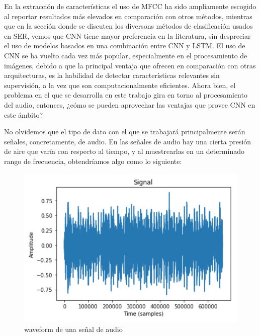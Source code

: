 \documentclass[11pt,a4paper,spanish]{book}
\begin{document}
	En la extracción de características el uso de MFCC ha sido ampliamente escogido al reportar resultados más elevados en comparación con otros métodos, mientras que en la sección donde se discuten los diversons métodos de clasificación usados en SER, vemos que CNN tiene mayor preferencia en la literatura, sin despreciar el uso de modelos basados en una combinación entre CNN y LSTM.\hfill \break
	El uso de CNN se ha vuelto cada vez más popular, especialmente en el procesamiento de imágenes, debido a que la principal ventaja que ofrecen en comparación con otras arquitecturas, es la habilidad de detectar características relevantes sin supervisión, a la vez que son computacionalmente eficientes.
	Ahora bien, el problema en el que se desarrolla en este trabajo gira en torno al procesamiento del audio, entonces, ¿cómo se pueden aprovechar las ventajas que provee CNN en este ámbito?
	
	No olvidemos que el tipo de dato con el que se trabajará principalmente serán señales, concretamente, de audio. En las señales de audio hay una cierta presión de aire que varía con respecto al tiempo, y al muestrearlas en un determinado rango de frecuencia, obtendríamos algo como lo siguiente:
	
	\begin{figure}[H]
		\includegraphics[scale=0.4]{waveform.png}
		\caption{waveform de una señal de audio}
	\end{figure}
	
\end{document}
